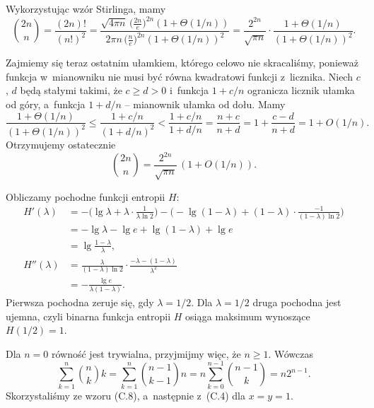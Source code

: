 \exercise %
Wykorzystując wzór Stirlinga, mamy
\[
	\binom{2n}{n} = \frac{(2n)!}{(n!)^2} = \frac{\sqrt{4\pi n}\,\bigl(\frac{2n}{e}\bigr)^{2n}(1+\Theta(1/n))}{2\pi n\,\bigl(\frac{n}{e}\bigr)^{2n}(1+\Theta(1/n))^2} = \frac{2^{2n}}{\sqrt{\pi n}}\cdot\frac{1+\Theta(1/n)}{(1+\Theta(1/n))^2}.
\]

Zajmiemy się teraz ostatnim ułamkiem, którego celowo nie skracaliśmy, ponieważ funkcja w~mianowniku nie musi być równa kwadratowi funkcji z~licznika.
Niech $c$, $d$ będą stałymi takimi, że $c\ge d>0$ i~funkcja $1+c/n$ ogranicza licznik ułamka od góry, a~funkcja $1+d/n$ -- mianownik ułamka od dołu.
Mamy
\[
    \frac{1+\Theta(1/n)}{(1+\Theta(1/n))^2} \le \frac{1+c/n}{(1+d/n)^2} < \frac{1+c/n}{1+d/n} = \frac{n+c}{n+d} = 1+\frac{c-d}{n+d} = 1+O(1/n).
\]
Otrzymujemy ostatecznie
\[
    \binom{2n}{n} = \frac{2^{2n}}{\sqrt{\pi n}}\,(1+O(1/n)).
\]

\exercise %
Obliczamy pochodne funkcji entropii $H$:
\begin{align*}
    H'(\lambda) &= -\biggl(\lg\lambda+\lambda\cdot\frac{1}{\lambda\ln2}\biggr)-\biggl(-\lg(1-\lambda)+(1-\lambda)\cdot\frac{-1}{(1-\lambda)\ln2}\biggr) \\[1mm]
	&= -\lg\lambda-\lg e+\lg(1-\lambda)+\lg e \\[1mm]
	&= \lg\frac{1-\lambda}{\lambda}, \\[1mm]
	H''(\lambda) &= \frac{\lambda}{(1-\lambda)\ln2}\cdot\frac{-\lambda-(1-\lambda)}{\lambda^2} \\[1mm]
	&= -\frac{\lg e}{\lambda(1-\lambda)}.
\end{align*}
Pierwsza pochodna zeruje się, gdy $\lambda=1/2$.
Dla $\lambda=1/2$ druga pochodna jest ujemna, czyli binarna funkcja entropii $H$ osiąga maksimum wynoszące $H(1/2)=1$.

\exercise %
Dla $n=0$ równość jest trywialna, przyjmijmy więc, że $n\ge1$.
Wówczas
\[
	\sum_{k=1}^n\binom{n}{k}k = \sum_{k=1}^n\binom{n-1}{k-1}n = n\sum_{k=0}^{n-1}\binom{n-1}{k} = n2^{n-1}.
\]
Skorzystaliśmy ze wzoru (C.8), a~następnie z~(C.4) dla $x=y=1$.
